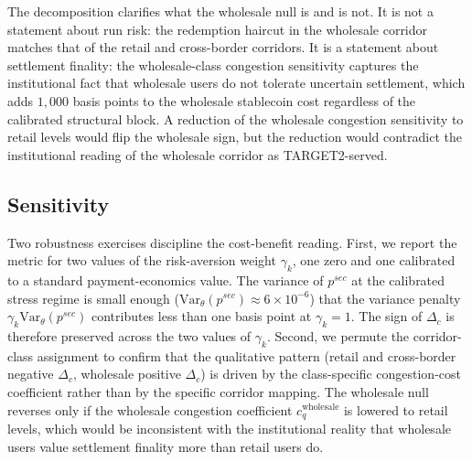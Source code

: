 The decomposition clarifies what the wholesale null is and is not. It is not a statement about run risk: the redemption haircut in the wholesale corridor matches that of the retail and cross-border corridors. It is a statement about settlement finality: the wholesale-class congestion sensitivity captures the institutional fact that wholesale users do not tolerate uncertain settlement, which adds $1{,}000$ basis points to the wholesale stablecoin cost regardless of the calibrated structural block. A reduction of the wholesale congestion sensitivity to retail levels would flip the wholesale sign, but the reduction would contradict the institutional reading of the wholesale corridor as TARGET2-served.

\subsection{Sensitivity}\label{sub:cb_sensitivity}

Two robustness exercises discipline the cost-benefit reading. First, we report the metric for two values of the risk-aversion weight $\gamma_k$, one zero and one calibrated to a standard payment-economics value. The variance of $p^{sec}$ at the calibrated stress regime is small enough ($\mathrm{Var}_\theta(p^{sec}) \approx 6 \times 10^{-6}$) that the variance penalty $\gamma_k \mathrm{Var}_\theta(p^{sec})$ contributes less than one basis point at $\gamma_k = 1$. The sign of $\Delta_c$ is therefore preserved across the two values of $\gamma_k$. Second, we permute the corridor-class assignment to confirm that the qualitative pattern (retail and cross-border negative $\Delta_c$, wholesale positive $\Delta_c$) is driven by the class-specific congestion-cost coefficient rather than by the specific corridor mapping. The wholesale null reverses only if the wholesale congestion coefficient $c_q^{\text{wholesale}}$ is lowered to retail levels, which would be inconsistent with the institutional reality that wholesale users value settlement finality more than retail users do.
